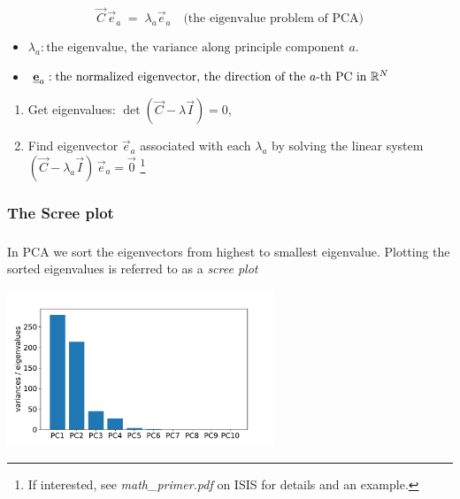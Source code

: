 \begin{frame}\frametitle{\subsubsecname}

\begin{equation}
\vec C \, \vec e_a \; = \; \lambda_a \vec e_a  \quad\text{(the eigenvalue problem of PCA)}
\end{equation}

\begin{itemize}
\item[] $\lambda_a: \text{the eigenvalue, the variance along principle component } a.$
\item[] $\underline{\mathbf{e}}_a: \text{the normalized eigenvector, the direction of the } a\text{-th PC in } \mathbb{R}^N$
\end{itemize}


\pause

\begin{enumerate}
\item Get eigenvalues: $\det(\vec C-\lambda \vec I) = 0$, 
\item Find eigenvector $\vec e_a$ associated with each $\lambda_a$ by solving the linear system\\
$ (\vec C - \lambda_a \vec I )\, \vec e_a = \vec 0$
\footnote{If interested, see {\emph{math\_primer.pdf} on ISIS} for details and an example.}
\end{enumerate}

\end{frame}

\subsubsection{The Scree plot}

\begin{frame}\frametitle{\subsubsecname}

In PCA we sort the eigenvectors from highest to smallest eigenvalue.
Plotting the sorted eigenvalues is referred to as a \emph{scree plot}

\begin{center}
\includegraphics[width=0.6\textwidth]{img/screeplot_kpca_poly_d3}%
\end{center}

\end{frame}


